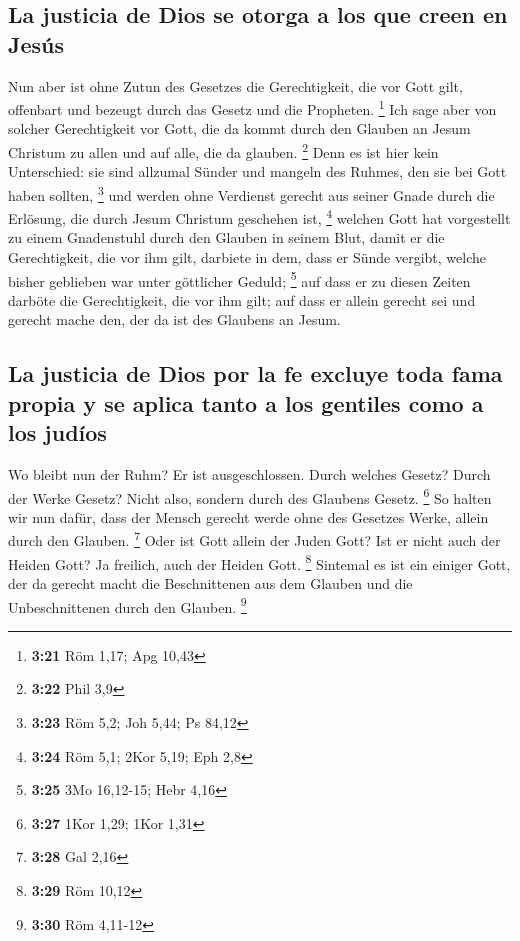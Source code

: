 \hypertarget{la-justicia-de-dios-se-otorga-a-los-que-creen-en-jesuxfas}{%
\subsection{La justicia de Dios se otorga a los que creen en
Jesús}\label{la-justicia-de-dios-se-otorga-a-los-que-creen-en-jesuxfas}}

 Nun aber ist ohne Zutun des Gesetzes die Gerechtigkeit,
die vor Gott gilt, offenbart und bezeugt durch das Gesetz und die
Propheten. \footnote{\textbf{3:21} Röm 1,17; Apg 10,43} 
Ich sage aber von solcher Gerechtigkeit vor Gott, die da kommt durch den
Glauben an Jesum Christum zu allen und auf alle, die da glauben.
\footnote{\textbf{3:22} Phil 3,9}  Denn es ist hier kein
Unterschied: sie sind allzumal Sünder und mangeln des Ruhmes, den sie
bei Gott haben sollten, \footnote{\textbf{3:23} Röm 5,2; Joh 5,44; Ps
  84,12}  und werden ohne Verdienst gerecht aus seiner
Gnade durch die Erlösung, die durch Jesum Christum geschehen ist,
\footnote{\textbf{3:24} Röm 5,1; 2Kor 5,19; Eph 2,8} 
welchen Gott hat vorgestellt zu einem Gnadenstuhl durch den Glauben in
seinem Blut, damit er die Gerechtigkeit, die vor ihm gilt, darbiete in
dem, dass er Sünde vergibt, welche bisher geblieben war unter göttlicher
Geduld; \footnote{\textbf{3:25} 3Mo 16,12-15; Hebr 4,16} 
auf dass er zu diesen Zeiten darböte die Gerechtigkeit, die vor ihm
gilt; auf dass er allein gerecht sei und gerecht mache den, der da ist
des Glaubens an Jesum.

\hypertarget{la-justicia-de-dios-por-la-fe-excluye-toda-fama-propia-y-se-aplica-tanto-a-los-gentiles-como-a-los-juduxedos}{%
\subsection{La justicia de Dios por la fe excluye toda fama propia y se
aplica tanto a los gentiles como a los
judíos}\label{la-justicia-de-dios-por-la-fe-excluye-toda-fama-propia-y-se-aplica-tanto-a-los-gentiles-como-a-los-juduxedos}}

 Wo bleibt nun der Ruhm? Er ist ausgeschlossen. Durch
welches Gesetz? Durch der Werke Gesetz? Nicht also, sondern durch des
Glaubens Gesetz. \footnote{\textbf{3:27} 1Kor 1,29; 1Kor 1,31}
 So halten wir nun dafür, dass der Mensch gerecht werde
ohne des Gesetzes Werke, allein durch den Glauben. \footnote{\textbf{3:28}
  Gal 2,16}  Oder ist Gott allein der Juden Gott? Ist er
nicht auch der Heiden Gott? Ja freilich, auch der Heiden Gott.
\footnote{\textbf{3:29} Röm 10,12}  Sintemal es ist ein
einiger Gott, der da gerecht macht die Beschnittenen aus dem Glauben und
die Unbeschnittenen durch den Glauben. \footnote{\textbf{3:30} Röm
  4,11-12}

